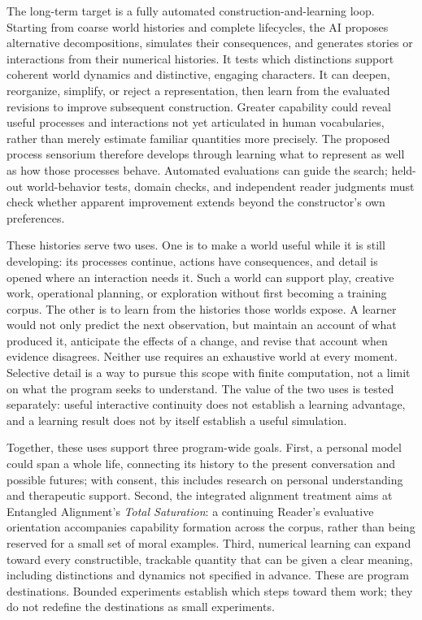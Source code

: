 \documentclass[10pt]{article}
\begin{document}
The long-term target is a fully automated construction-and-learning loop.
Starting from coarse world histories and complete lifecycles, the AI proposes
alternative decompositions, simulates their consequences, and generates
stories or interactions from their numerical histories. It tests which
distinctions support coherent world dynamics and distinctive, engaging
characters. It can deepen, reorganize, simplify, or
reject a representation, then learn from the evaluated revisions to improve
subsequent construction. Greater capability could reveal useful processes and
interactions not yet articulated in human vocabularies, rather than merely
estimate familiar quantities more precisely. The proposed process sensorium
therefore develops through learning what to represent as well as how those
processes behave. Automated evaluations can guide the search; held-out
world-behavior tests, domain checks, and independent reader judgments must
check whether apparent improvement extends beyond the constructor's own
preferences.

These histories serve two uses. One is to make a world useful while it is still
developing: its processes continue, actions have consequences, and detail is
opened where an interaction needs it. Such a world can support play, creative
work, operational planning, or exploration without first becoming a training
corpus. The other is to learn from the histories those worlds expose. A learner would not only predict
the next observation, but maintain an account of what produced it, anticipate
the effects of a change, and revise that account when evidence disagrees.
Neither use requires an exhaustive world at every moment. Selective detail is
a way to pursue this scope with finite computation, not a limit on what the
program seeks to understand. The value of the two uses is tested separately:
useful interactive continuity does not establish a learning advantage, and a
learning result does not by itself establish a useful simulation.

Together, these uses support three program-wide goals. First, a personal model could span
a whole life, connecting its history to the present conversation and possible
futures; with consent, this includes research on personal understanding and
therapeutic support. Second, the integrated alignment treatment aims at
Entangled Alignment's \emph{Total Saturation}: a continuing Reader's evaluative
orientation accompanies capability formation across the corpus, rather than
being reserved for a small set of moral examples. Third, numerical learning
can expand toward every constructible, trackable quantity that can be given a
clear meaning, including distinctions and dynamics not specified in advance.
These are program destinations. Bounded experiments establish which steps
toward them work; they do not redefine the destinations as small experiments.
\end{document}
